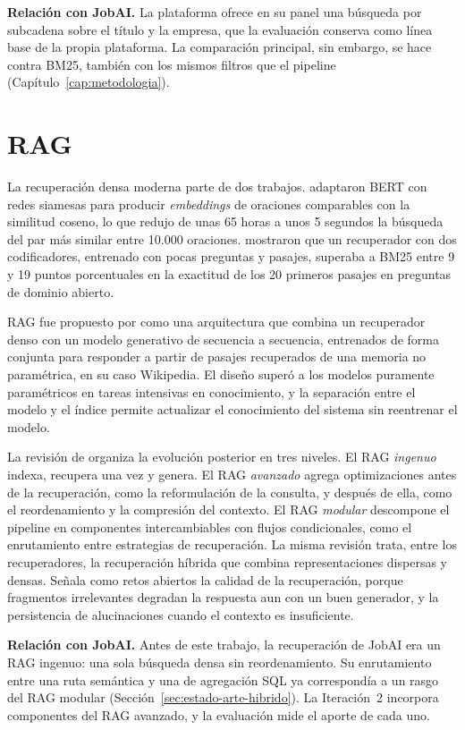 \textbf{Relación con JobAI.} La plataforma ofrece en su panel una búsqueda por subcadena sobre el título y la empresa, que la evaluación conserva como línea base de la propia plataforma. La comparación principal, sin embargo, se hace contra BM25, también con los mismos filtros que el pipeline (Capítulo~\ref{cap:metodologia}).

\section{RAG}
\label{sec:estado-arte-rag}

La recuperación densa moderna parte de dos trabajos. \citet{Reimers2019} adaptaron BERT con redes siamesas para producir \textit{embeddings} de oraciones comparables con la similitud coseno, lo que redujo de unas 65 horas a unos 5 segundos la búsqueda del par más similar entre 10.000 oraciones. \citet{Karpukhin2020} mostraron que un recuperador con dos codificadores, entrenado con pocas preguntas y pasajes, superaba a BM25 entre 9 y 19 puntos porcentuales en la exactitud de los 20 primeros pasajes en preguntas de dominio abierto.

RAG fue propuesto por \citet{Lewis2020} como una arquitectura que combina un recuperador denso con un modelo generativo de secuencia a secuencia, entrenados de forma conjunta para responder a partir de pasajes recuperados de una memoria no paramétrica, en su caso Wikipedia. El diseño superó a los modelos puramente paramétricos en tareas intensivas en conocimiento, y la separación entre el modelo y el índice permite actualizar el conocimiento del sistema sin reentrenar el modelo.

La revisión de \citet{Gao2023} organiza la evolución posterior en tres niveles. El RAG \emph{ingenuo} indexa, recupera una vez y genera. El RAG \emph{avanzado} agrega optimizaciones antes de la recuperación, como la reformulación de la consulta, y después de ella, como el reordenamiento y la compresión del contexto. El RAG \emph{modular} descompone el pipeline en componentes intercambiables con flujos condicionales, como el enrutamiento entre estrategias de recuperación. La misma revisión trata, entre los recuperadores, la recuperación híbrida que combina representaciones dispersas y densas. Señala como retos abiertos la calidad de la recuperación, porque fragmentos irrelevantes degradan la respuesta aun con un buen generador, y la persistencia de alucinaciones cuando el contexto es insuficiente.

\textbf{Relación con JobAI.} Antes de este trabajo, la recuperación de JobAI era un RAG ingenuo: una sola búsqueda densa sin reordenamiento. Su enrutamiento entre una ruta semántica y una de agregación SQL ya correspondía a un rasgo del RAG modular (Sección~\ref{sec:estado-arte-hibrido}). La Iteración~2 incorpora componentes del RAG avanzado, y la evaluación mide el aporte de cada uno.


